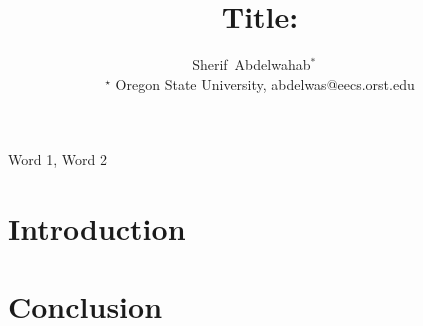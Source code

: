 \documentclass[10pt,journal]{IEEEtran}
\begin{document}
\title{Title:}

\author{Sherif~Abdelwahab$^*$
~\\
$^{\star}$ \small Oregon State University, abdelwas@eecs.orst.edu\\
\vspace{-20pt}
}

\maketitle
{}

\begin{abstract}
% 
\end{abstract}

\begin{IEEEkeywords}
Word 1, Word 2 
\end{IEEEkeywords}

\IEEEpeerreviewmaketitle

\section{Introduction}
\label{intro}
 \acresetall

\section{Conclusion}
\label{conclusion}



\end{document}
